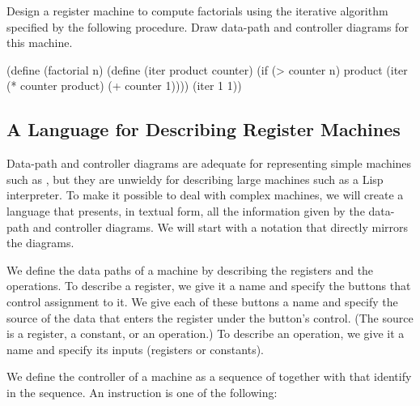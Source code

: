 \begin{exerciseGroup}
\label{Exercise 5.1}
 Design a register machine to
compute factorials using the iterative algorithm specified by the following
procedure.  Draw data-path and controller diagrams for this machine.

\begin{codeBlock}
(define (factorial n)
  (define (iter product counter)
    (if (> counter n)
        product
        (iter (* counter product)
              (+ counter 1))))
  (iter 1 1))
\end{codeBlock}
\end{exerciseGroup}



\subsection{A Language for Describing Register Machines}
\label{Section 5.1.1}

Data-path and controller diagrams are adequate for representing simple machines
such as , but they are unwieldy for describing large machines such
as a Lisp interpreter.  To make it possible to deal with complex machines, we
will create a language that presents, in textual form, all the information
given by the data-path and controller diagrams.  We will start with a notation
that directly mirrors the diagrams.

We define the data paths of a machine by describing the registers and the
operations.  To describe a register, we give it a name and specify the buttons
that control assignment to it.  We give each of these buttons a name and
specify the source of the data that enters the register under the button's
control.  (The source is a register, a constant, or an operation.)  To describe
an operation, we give it a name and specify its inputs (registers or
constants).

We define the controller of a machine as a sequence of 
together with  that identify  in the
sequence. An instruction is one of the following:


